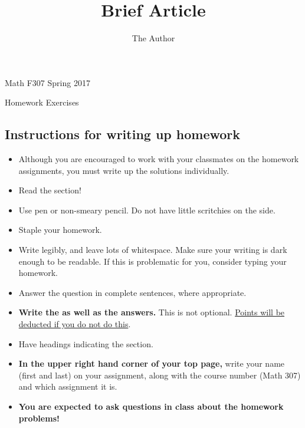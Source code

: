 \documentclass[11pt]{amsart}
\title{Brief Article}
\author{The Author}
\begin{document}
\begin{center}
\begin{Large} Math F307 \hfill Spring 2017

Homework Exercises 
\end{Large}
\end{center}

\subsection*{Instructions for writing up homework}
\begin{itemize}
\item Although you are encouraged to work with your classmates on the homework assignments, you must write up the solutions individually.
\item Read the section!
 \item Use pen or non-smeary pencil. Do not have little scritchies on the side. 
 \item Staple your homework. 
 \item Write legibly, and leave lots of whitespace. Make sure your writing is dark enough to be readable. If this is problematic for you, consider typing your homework.
 \item Answer the question in complete sentences, where appropriate.
\item {\bf Write the  as well as the answers. } This is not optional. \underline{Points will be deducted if you do not do this}.
\item Have headings indicating the section.
\item {\bf In the upper right hand corner of your top page,} write your name (first and last) on your assignment, along with the course number (Math 307) and which assignment it is.
\item {\bf You are expected to ask questions in class about the homework problems!}
\end{itemize}
\end{document}
